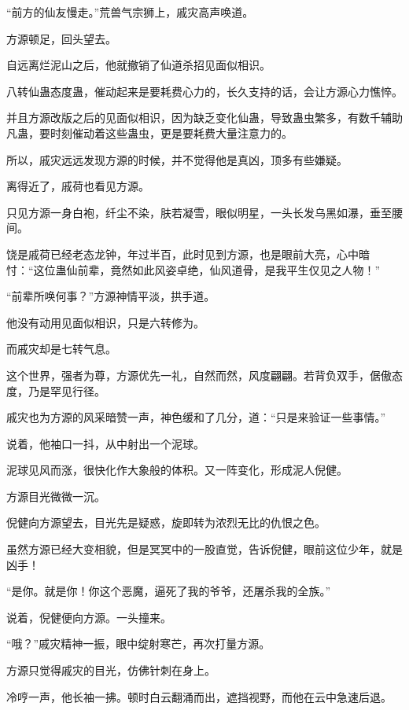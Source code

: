 
\begin{this_body}

“前方的仙友慢走。”荒兽气宗狮上，戚灾高声唤道。

方源顿足，回头望去。

自远离烂泥山之后，他就撤销了仙道杀招见面似相识。

八转仙蛊态度蛊，催动起来是要耗费心力的，长久支持的话，会让方源心力憔悴。

并且方源改版之后的见面似相识，因为缺乏变化仙蛊，导致蛊虫繁多，有数千辅助凡蛊，要时刻催动着这些蛊虫，更是要耗费大量注意力的。

所以，戚灾远远发现方源的时候，并不觉得他是真凶，顶多有些嫌疑。

离得近了，戚荷也看见方源。

只见方源一身白袍，纤尘不染，肤若凝雪，眼似明星，一头长发乌黑如瀑，垂至腰间。

饶是戚荷已经老态龙钟，年过半百，此时见到方源，也是眼前大亮，心中暗忖：“这位蛊仙前辈，竟然如此风姿卓绝，仙风道骨，是我平生仅见之人物！”

“前辈所唤何事？”方源神情平淡，拱手道。

他没有动用见面似相识，只是六转修为。

而戚灾却是七转气息。

这个世界，强者为尊，方源优先一礼，自然而然，风度翩翩。若背负双手，倨傲态度，乃是罕见行径。

戚灾也为方源的风采暗赞一声，神色缓和了几分，道：“只是来验证一些事情。”

说着，他袖口一抖，从中射出一个泥球。

泥球见风而涨，很快化作大象般的体积。又一阵变化，形成泥人倪健。

方源目光微微一沉。

倪健向方源望去，目光先是疑惑，旋即转为浓烈无比的仇恨之色。

虽然方源已经大变相貌，但是冥冥中的一股直觉，告诉倪健，眼前这位少年，就是凶手！

“是你。就是你！你这个恶魔，逼死了我的爷爷，还屠杀我的全族。”

说着，倪健便向方源。一头撞来。

“哦？”戚灾精神一振，眼中绽射寒芒，再次打量方源。

方源只觉得戚灾的目光，仿佛针刺在身上。

冷哼一声，他长袖一拂。顿时白云翻涌而出，遮挡视野，而他在云中急速后退。


\end{this_body}
